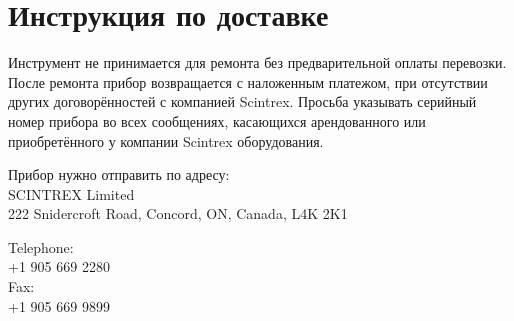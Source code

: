 \section{Инструкция по доставке}
\label{sec:shipping_instructions}

Инструмент не принимается для ремонта без предварительной оплаты перевозки.
После ремонта прибор возвращается с наложенным платежом, при отсутствии других
договорённостей с компанией Scintrex. Просьба указывать серийный номер прибора
во всех сообщениях, касающихся арендованного или приобретённого у компании
Scintrex оборудования.

Прибор нужно отправить по адресу:\\
SCINTREX Limited\\
222 Snidercroft Road, Concord, ON, Canada, L4K 2K1

Telephone:\\
+1 905 669 2280\\
Fax:\\
+1 905 669 9899

